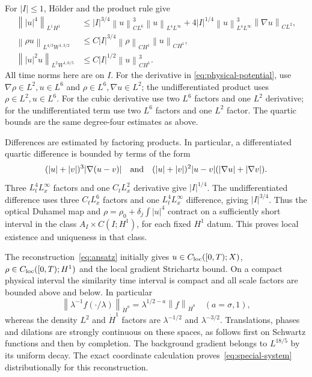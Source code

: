\documentclass[11pt]{article}
\numberwithin{equation}{section}
\theoremstyle{remark}
\newcommand{\norm}[1]{\left\|#1\right\|}
\newcommand{\dH}{\dot H}
\begin{document}
For $|I|\le1$, H\"older and the product rule give
\begin{align}
 \norm{|u|^4}_{L^1H^1}
 &\le |I|^{3/4}\norm u_{CL^6}^3\norm u_{L^4L^\infty}
       +4|I|^{1/4}\norm u_{L^4L^\infty}^3\norm{\nabla u}_{CL^2},
       \label{eq:physical-quartic}\\
 \norm{\rho u}_{L^{4/3}W^{1,3/2}}
 &\le C|I|^{3/4}\norm\rho_{CH^1}\norm u_{CH^1},
       \label{eq:physical-potential}\\
 \norm{|u|^2u}_{L^2W^{1,6/5}}
 &\le C|I|^{1/2}\norm u_{CH^1}^3.
       \label{eq:physical-cubic}
\end{align}
All time norms here are on $I$. For the derivative in
\eqref{eq:physical-potential}, use
$\nabla\rho\in L^2,u\in L^6$ and
$\rho\in L^6,\nabla u\in L^2$; the undifferentiated product uses
$\rho\in L^2,u\in L^6$.
For the cubic derivative use two $L^6$ factors and one $L^2$ derivative;
for the undifferentiated term use two $L^6$ factors and one $L^2$ factor.
The quartic bounds are the same degree-four estimates as above.

Differences are estimated by factoring products. In particular, a
differentiated quartic difference is bounded by terms of the form
\[
 (|u|+|v|)^3|\nabla(u-v)|
 \quad\hbox{and}\quad
 (|u|+|v|)^2|u-v|(|\nabla u|+|\nabla v|).
\]
Three $L^4_tL^\infty_x$ factors and one $C_tL^2_x$ derivative give
$|I|^{1/4}$. The undifferentiated difference uses three $C_tL^6_x$
factors and one $L^4_tL^\infty_x$ difference, giving $|I|^{3/4}$.
Thus the optical Duhamel map and
$\rho=\rho_0+\delta_j\int|u|^4$ contract on a sufficiently short interval
in the class $A_I\times C(I;H^1)$, for each fixed $H^1$ datum.
This proves local existence and uniqueness in that class.

The reconstruction~\eqref{eq:ansatz} initially gives
$u\in C_{\rm loc}([0,T);X)$,
$\rho\in C_{\rm loc}([0,T);H^1)$ and the local gradient Strichartz
bound. On a compact physical interval the similarity time interval is
compact and all scale factors are bounded above and below.
In particular
\[
 \norm{\lambda^{-1}f(\cdot/\lambda)}_{\dH^a}
       =\lambda^{1/2-a}\norm f_{\dH^a}\quad(a=\sigma,1),
\]
whereas the density $L^2$ and $\dH^1$ factors are
$\lambda^{-1/2}$ and $\lambda^{-3/2}$.
Translations, phases and dilations are strongly continuous on these
spaces, as follows first on Schwartz functions and then by completion.
The background gradient belongs to $L^{18/5}$ by its uniform decay.
The exact coordinate calculation proves~\eqref{eq:special-system}
distributionally for this reconstruction.
\end{document}
